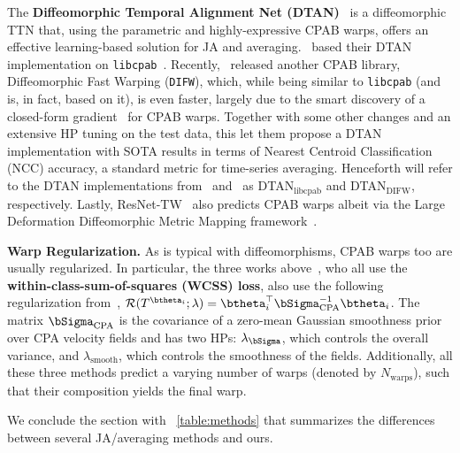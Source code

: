 The \textbf{Diffeomorphic Temporal Alignment Net (DTAN)}~\cite{Shapira:NIPS:2019:DTAN}
is a diffeomorphic TTN that, using the parametric and highly-expressive CPAB warps, offers an effective learning-based solution for JA and averaging.~\citet{Shapira:NIPS:2019:DTAN} based their DTAN implementation on \texttt{libcpab}~\cite{Detlefsen:2018:libcpab}.  
Recently,~\citet{Martinez:ICML:2022:closed} released another CPAB library, Diffeomorphic Fast Warping (\texttt{DIFW}), 
which, while being similar to \texttt{libcpab} (and is, in fact, based on it), is even faster, largely due to the smart discovery of a closed-form gradient~\cite{Martinez:ICML:2022:closed} for CPAB warps. 
Together with some other changes and an extensive HP tuning on the test data, 
this let them propose
a DTAN implementation with SOTA results in terms of Nearest Centroid Classification (NCC) accuracy, a standard metric for time-series averaging.  
 Henceforth will refer to the DTAN implementations from~\cite{Shapira:NIPS:2019:DTAN} and~\cite{Martinez:ICML:2022:closed}
 as DTAN$_{\mathrm{libcpab}}$ and DTAN$_{\mathrm{DIFW}}$, respectively. 
Lastly, ResNet-TW~\cite{huang:2021:residual} also predicts CPAB warps albeit via the Large Deformation Diffeomorphic Metric Mapping 
framework~\cite{Beg:IJCV:2005}.

%
\textbf{Warp Regularization.} As is typical with diffeomorphisms, 
CPAB warps too are usually regularized. %
In particular, the three works above~\cite{Shapira:NIPS:2019:DTAN,huang:2021:residual,Martinez:ICML:2022:closed},
who all use the \textbf{within-class-sum-of-squares (WCSS) loss}, 
 also use the following regularization from~\cite{Freifeld:ICCV:2015:CPAB}, 
$\Rcal(T^{\btheta_i};\lambda) = \btheta_i^{\top}\bSigma^{-1}_{\mathrm{CPA}}\btheta_i$. 
The matrix $\bSigma_{\mathrm{CPA}}$ is the covariance of a
zero-mean Gaussian smoothness prior over CPA velocity fields
and has two HPs: $\lambda_{\bSigma}$, which controls the overall variance, and
$\lambda_{\mathrm{smooth}}$, which controls the smoothness of the fields. Additionally, all these three methods predict a varying number of warps (denoted by $N_{\mathrm{warps}}$), such that their composition yields the final warp.

We conclude the section with ~\autoref{table:methods} that summarizes the differences between several JA/averaging methods and ours.